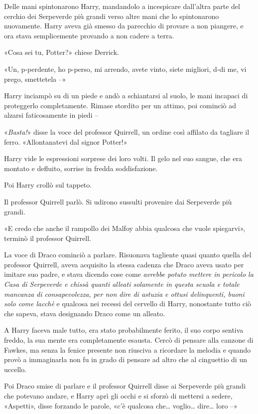 Delle mani spintonarono Harry, mandandolo a incespicare dall’altra parte del cerchio dei Serpeverde più grandi verso altre mani che lo spintonarono nuovamente. Harry aveva già smesso da parecchio di provare a non piangere, e ora stava semplicemente provando a non cadere a terra.

«Cosa sei tu, Potter?» chiese Derrick.

«Un, p-perdente, ho p-perso, mi arrendo, avete vinto, siete migliori, d-di me, vi prego, smettetela –»

Harry inciampò su di un piede e andò a schiantarsi al suolo, le mani incapaci di proteggerlo completamente. Rimase stordito per un attimo, poi cominciò ad alzarsi faticosamente in piedi –

«\textit{Basta!}» disse la voce del professor Quirrell, un ordine così affilato da tagliare il ferro. «Allontanatevi dal signor Potter!»

Harry vide le espressioni sorprese dei loro volti. Il gelo nel suo sangue, che era montato e defluito, sorrise in fredda soddisfazione.

Poi Harry crollò sul tappeto.

Il professor Quirrell parlò. Si udirono sussulti provenire dai Serpeverde più grandi.

«E credo che anche il rampollo dei Malfoy abbia qualcosa che vuole spiegarvi», terminò il professor Quirrell.

La voce di Draco cominciò a parlare. Risuonava tagliente quasi quanto quella del professor Quirrell, aveva acquisito la stessa cadenza che Draco aveva usato per imitare suo padre, e stava dicendo cose come \textit{avrebbe potuto mettere in pericolo la Casa di Serpeverde e chissà quanti alleati solamente in questa scuola e totale mancanza di consapevolezza, per non dire di astuzia e ottusi delinquenti, buoni solo come lacchè} e qualcosa nei recessi del cervello di Harry, nonostante tutto ciò che sapeva, stava designando Draco come un alleato.

A Harry faceva male tutto, era stato probabilmente ferito, il suo corpo sentiva freddo, la sua mente era completamente esausta. Cercò di pensare alla canzone di Fawkes, ma senza la fenice presente non riusciva a ricordare la melodia e quando provò a immaginarla non fu in grado di pensare ad altro che al cinguettio di un uccello.

Poi Draco smise di parlare e il professor Quirrell disse ai Serpeverde più grandi che potevano andare, e Harry aprì gli occhi e si sforzò di mettersi a sedere, «Aspetti», disse forzando le parole, «c’è qualcosa che… voglio… dire… loro –»


